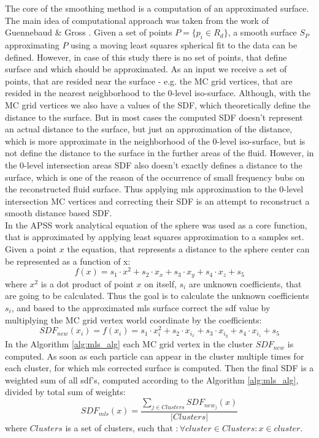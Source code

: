 The core of the smoothing method is a computation of an approximated surface. 
The main idea of computational approach was taken from the work of Guennebaud \& Gross \cite{Apss}. 
Given a set of points $P = \{p_i \in R_d \}$, a smooth surface $S_P$ approximating $P$ using a moving least squares spherical fit to the data can be defined. However, in case of this study there is no set of points, that define surface and which should be approximated. As an input we receive a set of points, that are resided near the surface - e.g. the MC grid vertices, that are resided in the nearest neighborhood to the 0-level iso-surface. 
Although, with the MC grid vertices we also have a values of the SDF, which theoretically define the distance to the surface. But in most cases the computed SDF doesn't represent an actual distance to the surface, but just an approximation of the distance, which is more approximate in the neighborhood of the 0-level iso-surface, but is not define the distance to the surface in the further areas of the fluid. 
However, in the 0-level intersection areas SDF also doesn't exactly defines a distance to the surface, which is one of the reason of the occurrence of small frequency bubs on the reconstructed fluid surface. Thus applying mls approximation to the 0-level intersection MC vertices and correcting their SDF is an attempt to reconstruct a smooth distance based SDF.\\
In the APSS work analytical equation of the sphere was used as a core function, that is approximated by applying least squares approximation to a samples set. Given a point $x$ the equation, that represents a distance to the sphere center can be represented as a function of x:
\begin{equation}
f(x) = s_1\cdot x^2 + s_2 \cdot x_x + s_3 \cdot x_y + s_4 \cdot x_z + s_5
\end{equation}
where $x^2$ is a dot product of point $x$ on itself, $s_i$ are unknown coefficients, that are going to be calculated. Thus the goal is to calculate the unknown coefficients $s_i$, and based to the approximated mls surface correct the sdf value by multiplying the MC grid vertex world coordinate by the coefficients:
\begin{equation}
SDF_{new}(x_i) = f(x_i) = s_1\cdot x_i^2 + s_2 \cdot x_{i_x} + s_3 \cdot x_{i_y} + s_4 \cdot x_{i_z} + s_5
\end{equation}
In the Algorithm \ref{alg:mls_alg} each MC grid vertex in the cluster $SDF_{new}$ is computed. As soon as each particle can appear in the cluster multiple times for each cluster, for which mls corrected surface is computed. Then the final SDF is a weighted sum of all sdf's, computed according to the Algorithm \ref{alg:mls_alg}, divided by total sum of weights:
\begin{equation}
	SDF_{mls}(x) = \dfrac{\sum_{j \in Clusters}{SDF_{new_j}(x)}}{|Clusters|}
\end{equation}
where $Clusters$ is a set of clusters, such that $: \forall cluster \in Clusters: x \in cluster$. 
